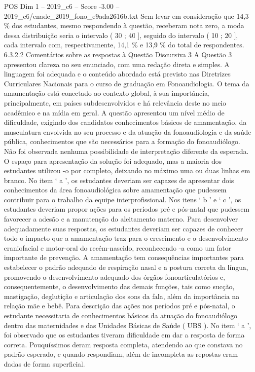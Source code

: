 \begin{textsample}{POS Dim 1 – 2019\_c6 – Score -3.00 – 2019\_c6/enade\_2019\_fono\_e9ada2616b.txt}
Sem levar em consideração que 14,3 \% dos estudantes, mesmo respondendo à questão, receberam nota zero, a moda dessa distribuição seria o intervalo ( 30 ; 40 ], seguido do intervalo ( 10 ; 20 ], cada intervalo com, respectivamente, 14,1 \% e 13,9 \% do total de respondentes. 6.3.2.2 Comentários sobre as respostas à Questão Discursiva 3 A Questão 3 apresentou clareza no seu enunciado, com uma redação direta e simples.
A linguagem foi adequada e o conteúdo abordado está previsto nas Diretrizes Curriculares Nacionais para o curso de graduação em Fonoaudiologia.
O tema da amamentação está conectado ao contexto global, à sua importância, principalmente, em países subdesenvolvidos e há relevância deste no meio acadêmico e na mídia em geral.
A questão apresentou um nível médio de dificuldade, exigindo dos candidatos conhecimentos básicos de amamentação, da musculatura envolvida no seu processo e da atuação da fonoaudiologia e da saúde pública, conhecimentos que são necessários para a formação do fonoaudiólogo.
Não foi observada nenhuma possibilidade de interpretação diferente da esperada.
O espaço para apresentação da solução foi adequado, mas a maioria dos estudantes utilizou -o por completo, deixando no máximo uma ou duas linhas em branco.
No item ‘ a ’, os estudantes deveriam ser capazes de apresentar dois conhecimentos da área fonoaudiológica sobre amamentação que pudessem contribuir para o trabalho da equipe interprofissional.
Nos itens ‘ b ’ e ‘ c ’, os estudantes deveriam propor ações para os períodos pré e pós-natal que pudessem favorecer a adesão e a manutenção do aleitamento materno.
Para desenvolver adequadamente suas respostas, os estudantes deveriam ser capazes de conhecer todo o impacto que a amamentação traz para o crescimento e o desenvolvimento craniofacial e motor-oral do recém-nascido, reconhecendo -a como um fator importante de prevenção.
A amamentação tem consequências importantes para estabelecer o padrão adequado de respiração nasal e a postura correta da língua, promovendo o desenvolvimento adequado dos órgãos fonoarticulatórios e, consequentemente, o desenvolvimento das demais funções, tais como sucção, mastigação, deglutição e articulação dos sons da fala, além da importância na relação mãe e bebê.
Para descrição das ações nos períodos pré e pós-natal, o estudante necessitaria de conhecimentos básicos da atuação do fonoaudiólogo dentro das maternidades e das Unidades Básicas de Saúde ( UBS ).
No item ‘ a ’, foi observado que os estudantes tiveram dificuldade em dar a resposta de forma correta.
Pouquíssimos deram resposta completa, atendendo ao que constava no padrão esperado, e quando respondiam, além de incompleta as repostas eram dadas de forma superficial.

\end{textsample}
